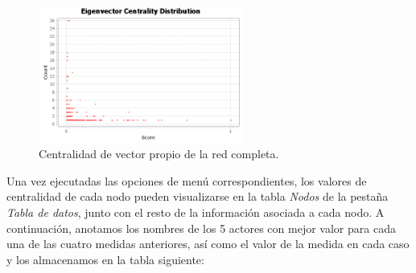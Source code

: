 \documentclass{uimppracticas}
\begin{document}
\begin{figure}[H]
	\centering
	\includegraphics[width=0.6\textwidth]{images/Eigenvector-Centrality}
	\caption{Centralidad de vector propio de la red completa.}
	\label{Eigenvector-Centrality}
\end{figure}

Una vez ejecutadas las opciones de menú correspondientes, los valores de centralidad de cada nodo pueden visualizarse en la tabla \textit{Nodos} de la pestaña \textit{Tabla de datos}, junto con el resto de la información asociada a cada nodo. A continuación, anotamos los nombres de los 5 actores con mejor valor para cada una de las cuatro medidas anteriores, así como el valor de la medida en cada caso y los almacenamos en la tabla siguiente:
\end{document}

